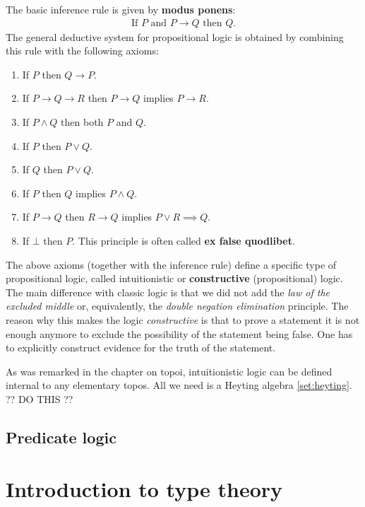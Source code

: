     The basic inference rule is given by \textbf{modus ponens}:
    \begin{gather}
        \text{If } P \text{ and } P\rightarrow Q \text{ then } Q.
    \end{gather}
    The general deductive system for propositional logic is obtained by combining this rule with the following axioms:
    \begin{enumerate}
        \item If $P$ then $Q\rightarrow P$.
        \item If $P\rightarrow Q \rightarrow R$ then $P\rightarrow Q$ implies $P\rightarrow R$.
        \item If $P\land Q$ then both $P$ and $Q$.
        \item If $P$ then $P\lor Q$.
        \item If $Q$ then $P\lor Q$.
        \item If $P$ then $Q$ implies $P\land Q$.
        \item If $P\rightarrow Q$ then $R\rightarrow Q$ implies $P\lor R\implies Q$.
        \item If $\bot$ then $P$. This principle is often called \textbf{ex false quodlibet}.
    \end{enumerate}

    \begin{remark}
        The above axioms (together with the inference rule) define a specific type of propositional logic, called intuitionistic or \textbf{constructive} (propositional) logic. The main difference with classic logic is that we did not add the \textit{law of the excluded middle} or, equivalently, the \textit{double negation elimination} principle. The reason why this makes the logic \textit{constructive} is that to prove a statement it is not enough anymore to exclude the possibility of the statement being false. One has to explicitly construct evidence for the truth of the statement.

        As was remarked in the chapter on topoi, intuitionistic logic can be defined internal to any elementary topos. All we need is a Heyting algebra \ref{set:heyting}. ?? DO THIS ??
    \end{remark}

\subsection{Predicate logic}

\section{Introduction to type theory}

